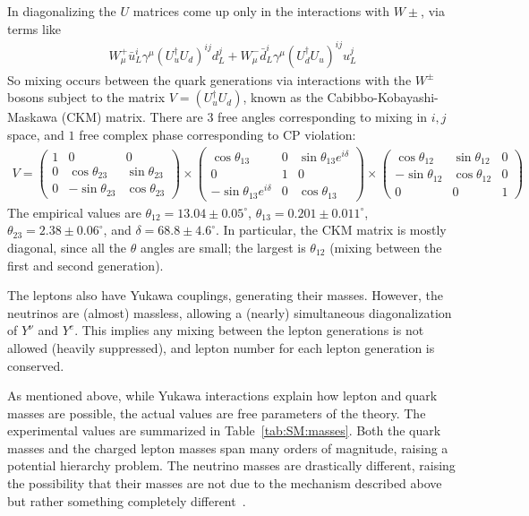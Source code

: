 In diagonalizing the $U$ matrices come up only in the interactions with $W\pm$, via terms like
\begin{align}
  W^+_\mu\bar{u}_L^i\gamma^\mu\left(U_u^\dagger U_d\right)^{ij} d_L^j + W^-_\mu\bar{d}_L^i\gamma^\mu\left(U_d^\dagger U_u\right)^{ij} u_L^j
\end{align}
So mixing occurs between the quark generations via interactions with the $W^\pm$ bosons subject to the matrix $V=\left(U_u^\dagger U_d\right)$, known as the Cabibbo-Kobayashi-Maskawa (CKM) matrix.
There are $3$ free angles corresponding to mixing in $i,j$ space, and $1$ free complex phase corresponding to CP violation:
\begin{align}
V = \begin{pmatrix} 1 & 0 & 0 \\ 0 & \cos\theta_{23} & \sin\theta_{23} \\ 0 & -\sin\theta_{23} & \cos\theta_{23} \end{pmatrix}\times
\begin{pmatrix} \cos\theta_{13} & 0 & \sin\theta_{13}e^{i\delta} \\ 0 & 1 & 0 \\-\sin\theta_{13}e^{i\delta} & 0 & \cos\theta_{13} \end{pmatrix}\times
\begin{pmatrix} \cos\theta_{12} & \sin\theta_{12} & 0 \\ -\sin\theta_{12} & \cos\theta_{12} & 0 \\ 0 & 0 & 1 \end{pmatrix}
\end{align}
The empirical values are $\theta_{12}=13.04\pm0.05^\circ$, $\theta_{13}=0.201\pm0.011^\circ$, $\theta_{23}=2.38\pm0.06^\circ$, and $\delta=68.8\pm4.6^\circ$.
In particular, the CKM matrix is mostly diagonal, since all the $\theta$ angles are small; the largest is $\theta_{12}$ (mixing between the first and second generation).

The leptons also have Yukawa couplings, generating their masses.
However, the neutrinos are (almost) massless, allowing a (nearly) simultaneous diagonalization of $Y^\nu$ and $Y^e$.
This implies any mixing between the lepton generations is not allowed (heavily suppressed), and lepton number for each lepton generation is conserved.

As mentioned above, while Yukawa interactions explain how lepton and quark masses are possible, the actual values are free parameters of the theory.
The experimental values are summarized in Table~\ref{tab:SM:masses}.
Both the quark masses and the charged lepton masses span many orders of magnitude, raising a potential hierarchy problem.
The neutrino masses are drastically different, raising the possibility that their masses are not due to the mechanism described above but rather something completely different~\cite{ref:TODO}.

